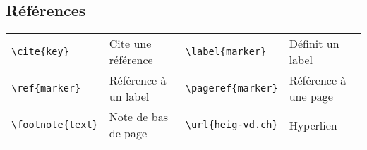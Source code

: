 \documentclass{article}
\let\code\lstinline
\begin{document}
\begin{multicols*}{3}



\section*{Références}
\begin{tabular}{p{1.8cm}p{2.2cm}p{2cm}l}
    \code!\cite{key}!      & Cite une référence   & \code!\label{marker}!   & Définit un label     \\
    \code!\ref{marker}!    & Référence à un label & \code!\pageref{marker}! & Référence à une page \\
    \code!\footnote{text}! & Note de bas de page  & \code!\url{heig-vd.ch}! & Hyperlien            \\
\end{tabular}
\end{multicols*}
\end{document}
